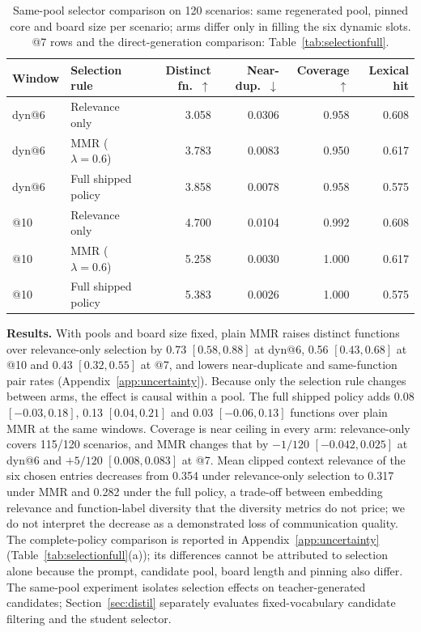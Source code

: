 \begin{table}[t]
\centering\footnotesize\renewcommand{\arraystretch}{0.9}
\setlength{\tabcolsep}{5pt}\setlength{\belowcaptionskip}{3pt}
\caption{Same-pool selector comparison on 120 scenarios: same regenerated pool, pinned core and board size per scenario; arms differ only in filling the six dynamic slots. @7 rows and the direct-generation comparison: Table~\ref{tab:selectionfull}.}
\label{tab:selection}
\begin{tabular}{llrrrr}
\toprule
Window & Selection rule & Distinct fn.\ $\uparrow$ & Near-dup.\ $\downarrow$ & Coverage $\uparrow$ & Lexical hit\\
\midrule
dyn@6 & Relevance only & 3.058 & 0.0306 & 0.958 & 0.608\\
dyn@6 & MMR ($\lambda=0.6$) & 3.783 & 0.0083 & 0.950 & 0.617\\
dyn@6 & Full shipped policy & 3.858 & 0.0078 & 0.958 & 0.575\\
@10 & Relevance only & 4.700 & 0.0104 & 0.992 & 0.608\\
@10 & MMR ($\lambda=0.6$) & 5.258 & 0.0030 & 1.000 & 0.617\\
@10 & Full shipped policy & 5.383 & 0.0026 & 1.000 & 0.575\\
\bottomrule
\end{tabular}
\end{table}

\textbf{Results.} With pools and board size fixed, plain MMR raises distinct functions over relevance-only selection by 0.73 $[0.58,0.88]$ at dyn@6, 0.56 $[0.43,0.68]$ at @10 and 0.43 $[0.32,0.55]$ at @7, and lowers near-duplicate and same-function pair rates (Appendix~\ref{app:uncertainty}). Because only the selection rule changes between arms, the effect is causal within a pool. The full shipped policy adds 0.08 $[-0.03,0.18]$, 0.13 $[0.04,0.21]$ and 0.03 $[-0.06,0.13]$ functions over plain MMR at the same windows. Coverage is near ceiling in every arm: relevance-only covers 115/120 scenarios, and MMR changes that by $-1/120$ $[-0.042,0.025]$ at dyn@6 and $+5/120$ $[0.008,0.083]$ at @7. %
Mean clipped context relevance of the six chosen entries decreases from 0.354 under relevance-only selection to 0.317 under MMR and 0.282 under the full policy, a trade-off between embedding relevance and function-label diversity that the diversity metrics do not price; we do not interpret the decrease as a demonstrated loss of communication quality. %
The complete-policy comparison is reported in Appendix~\ref{app:uncertainty} (Table~\ref{tab:selectionfull}(a)); its differences cannot be attributed to selection alone because the prompt, candidate pool, board length and pinning also differ. The same-pool experiment isolates selection effects on teacher-generated candidates; Section~\ref{sec:distil} separately evaluates fixed-vocabulary candidate filtering and the student selector. %


